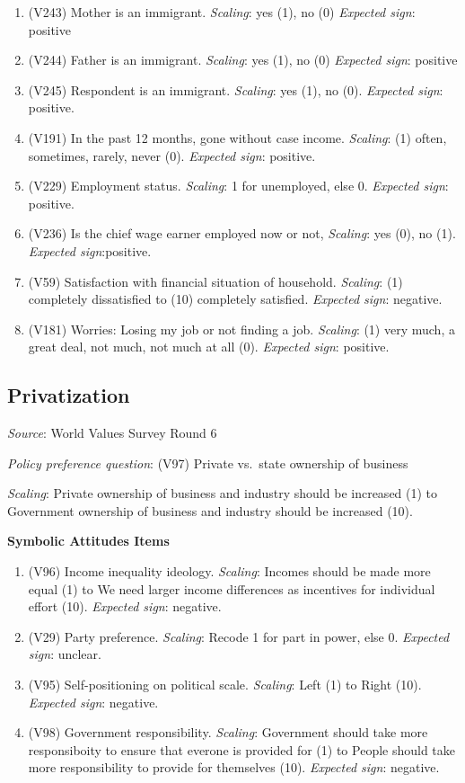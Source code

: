 \documentclass[]{article}
\begin{document}
\begin{enumerate}
  \item (V243) Mother is an immigrant. \textit{Scaling}: yes (1), no (0) \textit{Expected sign}: positive 
  \item (V244) Father is an immigrant. \textit{Scaling}: yes (1), no (0) \textit{Expected sign}: positive 
  \item (V245) Respondent is an immigrant. \textit{Scaling}: yes (1), no (0). \textit{Expected sign}: positive.
  \item (V191) In the past 12 months, gone without case income. \textit{Scaling}: (1) often, sometimes, rarely, never (0). \textit{Expected sign}: positive.
  \item (V229) Employment status. \textit{Scaling}: 1 for unemployed, else 0. \textit{Expected sign}: positive.
  \item (V236) Is the chief wage earner employed now or not, \textit{Scaling}: yes (0), no (1). \textit{Expected sign}:positive.
  \item (V59) Satisfaction with financial situation of household. \textit{Scaling}: (1) completely dissatisfied to (10) completely satisfied. \textit{Expected sign}: negative.
  \item (V181) Worries: Losing my job or not finding a job. \textit{Scaling}: (1) very much, a great deal, not much, not much at all (0). \textit{Expected sign}: positive.
\end{enumerate}

\subsection{Privatization}\label{privatization}

\textit{Source}: World Values Survey Round 6

\textit{Policy preference question}: (V97) Private vs.~state ownership
of business

\textit{Scaling}: Private ownership of business and industry should be
increased (1) to Government ownership of business and industry should be
increased (10).

\textbf{Symbolic Attitudes Items}

\begin{enumerate}
  \item (V96) Income inequality ideology. \textit{Scaling}: Incomes should be made more equal (1) to We need larger income differences as incentives for individual effort (10). \textit{Expected sign}: negative.
  \item (V29) Party preference. \textit{Scaling}: Recode 1 for part in power, else 0. \textit{Expected sign}: unclear.
  \item (V95) Self-positioning on political scale. \textit{Scaling}: Left (1) to Right (10). \textit{Expected sign}: negative.
  \item (V98) Government responsibility. \textit{Scaling}: Government should take more responsiboity to ensure that everone is provided for (1) to People should take more responsibility to provide for themselves (10). \textit{Expected sign}: negative.
\end{enumerate}
\end{document}
